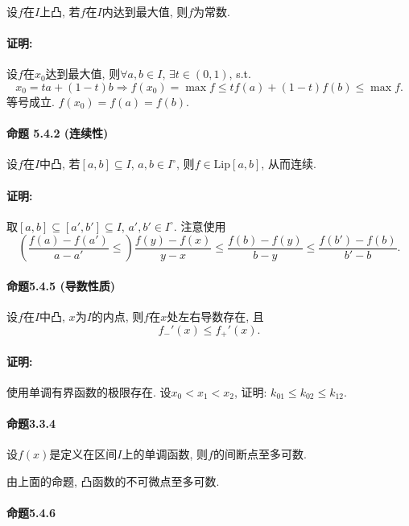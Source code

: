 设$f$在$I$上凸, 若$f$在$I$内达到最大值, 则$f$为常数.

\paragraph{证明:}

设$f$在$x_{0}$达到最大值, 则$\forall a,b\in I$, $\exists t\in(0,1)$, s.t.
\[
x_{0}=ta+(1-t)b\Longrightarrow f(x_{0})=\max f\le tf(a)+(1-t)f(b)\le\max f.
\]
等号成立. $f(x_{0})=f(a)=f(b)$.

\paragraph{命题 5.4.2 (连续性)}

设$f$在$I$中凸, 若$[a,b]\subseteq I$, $a,b\in I^{\circ}$, 则$f\in\mathrm{Lip}[a,b]$,
从而连续.

\paragraph{证明:}

取$[a,b]\subseteq[a',b']\subseteq I$, $a',b'\in I^{\circ}$. 注意使用
\[
\left(\frac{f(a)-f(a')}{a-a'}\le\right)\frac{f(y)-f(x)}{y-x}\le\frac{f(b)-f(y)}{b-y}\le\frac{f(b')-f(b)}{b'-b}.
\]


\paragraph{命题5.4.5 (导数性质)}

设$f$在$I$中凸, $x$为$I$的内点, 则$f$在$x$处左右导数存在, 且
\[
f_{-}'(x)\le f_{+}'(x).
\]


\paragraph{证明:}

使用单调有界函数的极限存在. 设$x_{0}<x_{1}<x_{2}$, 证明: $k_{01}\le k_{02}\le k_{12}$.

\paragraph{命题3.3.4}

设$f(x)$是定义在区间$I$上的单调函数, 则$f$的间断点至多可数.

由上面的命题, 凸函数的不可微点至多可数.

\paragraph{命题5.4.6}

